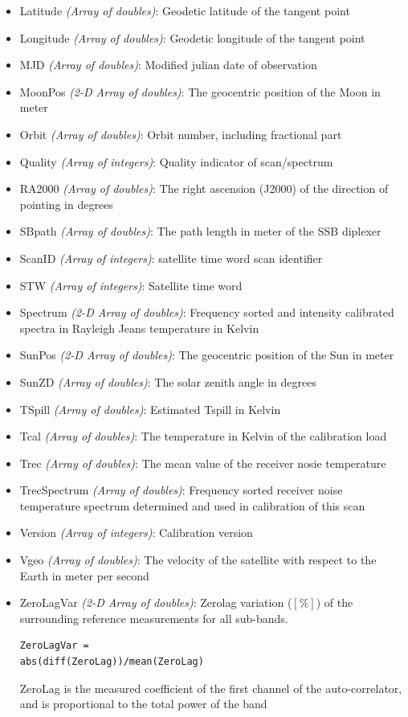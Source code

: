 \begin{itemize}
  \item Latitude \emph{(Array of doubles)}: Geodetic latitude of the tangent point
  \item Longitude \emph{(Array of doubles)}: Geodetic longitude of the tangent point
  \item MJD \emph{(Array of doubles)}: Modified julian date of observation
  \item MoonPos \emph{(2-D Array of doubles)}: The geocentric position of the Moon in meter
  \item Orbit \emph{(Array of doubles)}: Orbit number, including fractional part
  \item Quality \emph{(Array of integers)}: Quality indicator of scan/spectrum
  \item RA2000 \emph{(Array of doubles)}: The right ascension (J2000) of the direction of pointing in degrees
  \item SBpath \emph{(Array of doubles)}: The path length in meter of the SSB diplexer
  \item ScanID \emph{(Array of integers)}: satellite time word scan identifier
  \item STW \emph{(Array of integers)}: Satellite time word
  \item Spectrum \emph{(2-D Array of doubles)}: Frequency sorted and intensity calibrated spectra
                       in Rayleigh Jeans temperature in Kelvin
  \item SunPos \emph{(2-D Array of doubles)}: The geocentric position of the Sun in meter
  \item SunZD \emph{(Array of doubles)}: The solar zenith angle in degrees
  \item TSpill \emph{(Array of doubles)}: Estimated Tspill in Kelvin
  \item Tcal \emph{(Array of doubles)}: The temperature in Kelvin of the calibration load
  \item Trec \emph{(Array of doubles)}: The mean value of the receiver nosie temperature  
  \item TrecSpectrum \emph{(Array of doubles)}: Frequency sorted receiver noise temperature spectrum
                       determined and used in calibration of this scan

  \item Version \emph{(Array of integers)}: Calibration version
  \item Vgeo \emph{(Array of doubles)}: The velocity of the satellite with respect to the Earth in meter per second
  \item ZeroLagVar \emph{(2-D Array of doubles)}: Zerolag variation (\([\%]\)) of the surrounding reference measurements for all sub-bands.
                       \begin{verbatim}ZeroLagVar =
abs(diff(ZeroLag))/mean(ZeroLag)\end{verbatim} 
                        ZeroLag is the measured coefficient of the first channel of the auto-correlator,
                        and is proportional to the total power of the band
\end{itemize}



